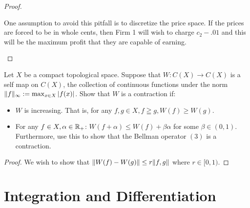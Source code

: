 \documentclass[12pt, letterpaper]{paper}
\begin{document}
\begin{question}
\begin{proof}
\begin{enumerate}
      One assumption to avoid this pitfall is to discretize the price
      space. If the prices are forced to be in whole cents, then Firm
      1 will wish to charge $c_2 - .01$ and this will be the maximum
      profit that they are capable of earning.
    \end{enumerate}
  \end{proof}
\end{question} 

\begin{question}
  Let $X$ be a compact topological space. Suppose that $W : C(X) \to
  C(X)$ is a self map on $C(X)$, the collection of continuous
  functions under the norm $\lVert f\rVert_{\infty} := \max_{x \in X} \left \lvert 
    f(x) \right \rvert$. Show that $W$ is a contraction if:
  \begin{itemize}
  \item $W$ is increasing. That is, for any $f,g \in X, f \geqq g, W(f) \geq
    W(g)$.
  \item For any $f \in X, \alpha \in \mathbb{R}_+$: $W(f+\alpha) \leq W(f) + \beta \alpha$ for some
    $\beta \in (0,1).$ Furthermore, use this to show that the Bellman
    operator $(3)$ is a contraction.
  \end{itemize}
  \begin{proof}
    We wish to show that $\lVert W(f)-W(g)\rVert \leq r \lVert f,g\rVert$ where $r
    \in [0,1)$. 
  \end{proof}
\end{question}


\section{Integration and Differentiation}
\end{document}
